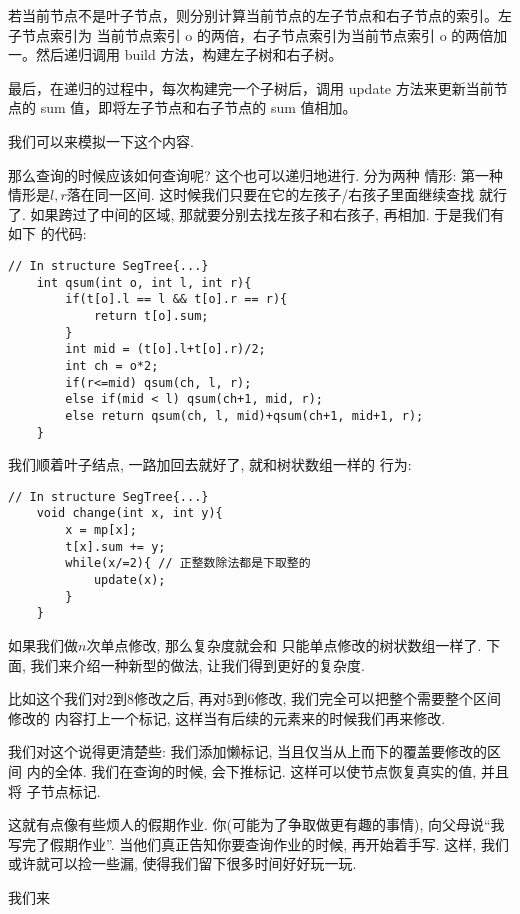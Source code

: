 若当前节点不是叶子节点，则分别计算当前节点的左子节点和右子节点的索引。左子节点索引为
当前节点索引 o 的两倍，右子节点索引为当前节点索引 o 的两倍加一。然后递归调用 
build 方法，构建左子树和右子树。

最后，在递归的过程中，每次构建完一个子树后，调用 update 方法来更新当前节点的 sum 值，即将左子节点和右子节点的 sum 值相加。

我们可以来模拟一下这个内容. 

那么查询的时候应该如何查询呢? 这个也可以递归地进行. 分为两种
情形: 第一种情形是$l,r$落在同一区间. 这时候我们只要在它的左孩子/右孩子里面继续查找
就行了. 如果跨过了中间的区域, 那就要分别去找左孩子和右孩子, 再相加. 于是我们有如下
的代码: 

\begin{lstlisting}
// In structure SegTree{...} 
    int qsum(int o, int l, int r){
        if(t[o].l == l && t[o].r == r){
            return t[o].sum;
        }
        int mid = (t[o].l+t[o].r)/2;
        int ch = o*2; 
        if(r<=mid) qsum(ch, l, r);
        else if(mid < l) qsum(ch+1, mid, r);
        else return qsum(ch, l, mid)+qsum(ch+1, mid+1, r); 
    }
\end{lstlisting}

 我们顺着叶子结点, 一路加回去就好了, 就和树状数组一样的
行为: 

\begin{lstlisting}
// In structure SegTree{...} 
    void change(int x, int y){
		x = mp[x];
		t[x].sum += y;
		while(x/=2){ // 正整数除法都是下取整的
			update(x);
		}
	}
\end{lstlisting}

 如果我们做$n$次单点修改, 那么复杂度就会和
只能单点修改的树状数组一样了. 下面, 我们来介绍一种新型的做法, 
让我们得到更好的复杂度. 


比如这个我们对2到8修改之后, 再对5到6修改, 我们完全可以把整个需要整个区间修改的
内容打上一个标记, 这样当有后续的元素来的时候我们再来修改. 

我们对这个说得更清楚些: 我们添加懒标记, 当且仅当从上而下的覆盖要修改的区间
内的全体. 我们在查询的时候, 会下推标记. 这样可以使节点恢复真实的值, 并且将
子节点标记. 

这就有点像有些烦人的假期作业. 你(可能为了争取做更有趣的事情), 
向父母说``我写完了假期作业''. 
当他们真正告知你要查询作业的时候, 再开始着手写. 这样, 我们或许就可以捡一些漏, 
使得我们留下很多时间好好玩一玩. 

我们来